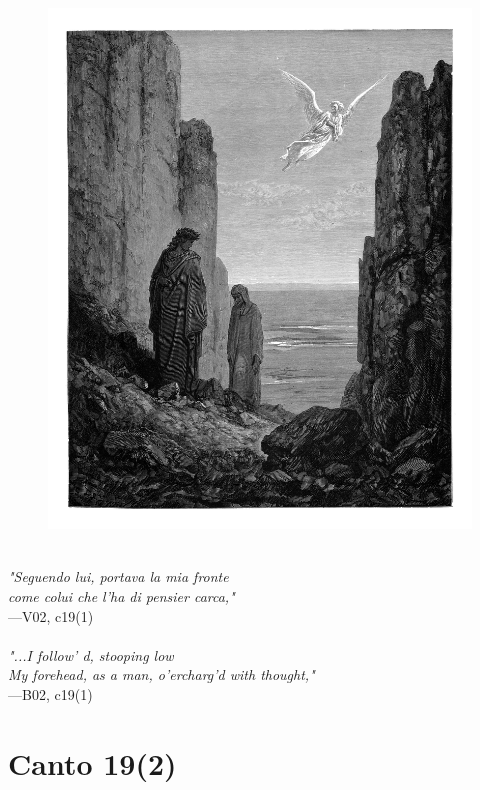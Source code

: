 \documentclass[../Dore_vision.tex]{subfiles}
\begin{document}
\begin{figure}[ht]
\centering
\includegraphics[height=\figsize]{illustrations/book_2/V02, c19(1).jpg}
\end{figure}

\begin{center}
\begin{minipage}{0.8\linewidth}
\textit{\\
"Seguendo lui, portava la mia fronte\\come colui che l’ha di pensier carca,"} \\
—V02, c19(1) \\~\\
\textit{"...I follow' d, stooping low\\My forehead, as a man, o'ercharg'd with thought,"} \\
—B02, c19(1)
\end{minipage}
\end{center}

\newpage

\section{Canto 19(2)}
\end{document}
